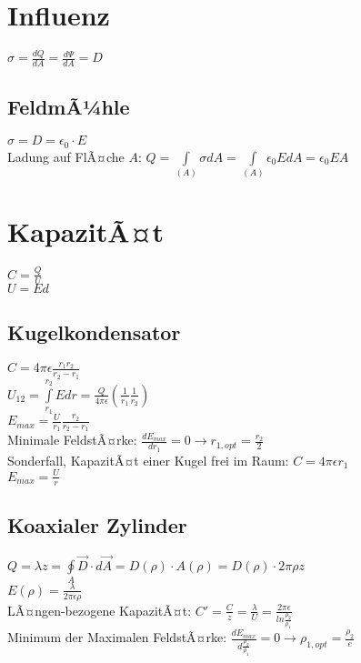 \documentclass[a4paper,twoside,12pt]{report}
\begin{document}
\section{Influenz}
$\sigma = \frac{dQ}{dA} = \frac{d\Psi}{dA}= D$

\subsection{FeldmÃ¼hle}
$\sigma = D = \epsilon_0 \cdot E$\\
Ladung auf FlÃ¤che $A$: $Q = \int\limits_{(A)}{\sigma dA} = \int\limits_{(A)}{\epsilon_0 EdA} = \epsilon_0 EA$\\

\section{KapazitÃ¤t}
$C = \frac{Q}{U}$\\
$U = Ed$

\subsection{Kugelkondensator}
$C = 4\pi\epsilon \frac{r_1r_2}{r_2-r_1}$\\
$U_{12} = \int\limits_{r_1}^{r_2}{Edr} = \frac{Q}{4\pi\epsilon}(\frac{1}{r_1}\frac{1}{r_2})$\\
$E_{max} = \frac{U}{r_1}\frac{r_2}{r_2-r_1}$\\
Minimale FeldstÃ¤rke: $\frac{dE_{max}}{dr_1} = 0 \rightarrow r_{1,opt} = \frac{r_2}{2}$
\\
Sonderfall,  KapazitÃ¤t einer Kugel frei im Raum: $C = 4\pi\epsilon r_1$\\
$E_{max} = \frac{U}{r}$\\

\subsection{Koaxialer Zylinder}
$Q = \lambda z = \oint\limits_A{\vec{D}\cdot d\vec{A}} = D(\rho) \cdot A(\rho) = D(\rho) \cdot 2\pi\rho z$\\
$E(\rho) = \frac{\lambda}{2\pi\epsilon\rho}$\\
LÃ¤ngen-bezogene KapazitÃ¤t: $C' = \frac{C}{z} = \frac{\lambda}{U} = \frac{2\pi\epsilon}{ln\frac{\rho_2}{\rho_1}}$\\
Minimum der Maximalen FeldstÃ¤rke: $\frac{dE_{max}}{d\frac{\rho_2}{\rho_1}} = 0 \rightarrow \rho_{1,opt} = \frac{\rho_2}{e}$\\
\end{document}
